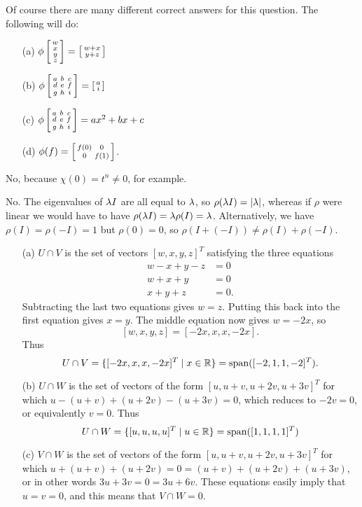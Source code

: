  Of course there are many different correct answers for this
 question.  The following will do:
 \begin{itemize}
  \item[(a)] $\phi\left[\begin{smallmatrix} w\\ x\\ y\\ z\end{smallmatrix}\right]=\left[\begin{smallmatrix} w+x\\ y+z\end{smallmatrix}\right]$
  \item[(b)] $\phi\left[\begin{smallmatrix} a&b&c \\ d&e&f\\ g&h&i\end{smallmatrix}\right] = \left[\begin{smallmatrix} a\\ i\end{smallmatrix}\right]$
  \item[(c)] $\phi\left[\begin{smallmatrix} a&b&c \\ d&e&f\\ g&h&i\end{smallmatrix}\right] = ax^2+bx+c$
  \item[(d)] $\phi(f)=\left[\begin{smallmatrix} f(0) & 0 \\ 0 & f(1) \end{smallmatrix}\right]$.
 \end{itemize}
\EndDeferredSolution

 No, because $\chi(0)=t^n\neq 0$, for example.
\EndDeferredSolution

 No.  The eigenvalues of $\lambda I$ are all equal to $\lambda$, so
 $\rho(\lambda I)=|\lambda|$, whereas if $\rho$ were linear we would
 have to have $\rho(\lambda I)=\lambda\rho(I)=\lambda$.  Alternatively,
 we have $\rho(I)=\rho(-I)=1$ but $\rho(0)=0$, so
 $\rho(I+(-I))\neq\rho(I)+\rho(-I)$.
\EndDeferredSolution

 \begin{itemize}
  \item[(a)] $U\cap V$ is the set of vectors $[w,x,y,z]^T$
   satisfying the three equations
   \begin{align*}
    w-x+y-z &= 0 \\
    w+x+y &= 0 \\
    x+y+z &= 0.
   \end{align*}
   Subtracting the last two equations gives $w=z$.  Putting
   this back into the first equation gives $x=y$.  The
   middle equation now gives $w=-2x$, so
   \[ [w,x,y,z] = [-2x,x,x,-2x]. \]
   Thus
   \[ U\cap V = \{ [-2x,x,x,-2x]^T \;|\; x\in{\mathbb{R}}\} =
       \operatorname{span}([-2,1,1,-2]^T).
   \]
  \item[(b)] $U\cap W$ is the set of vectors of the form
   $[u,u+v,u+2v,u+3v]^T$ for which
   $u-(u+v)+(u+2v)-(u+3v)=0$, which reduces to $-2v=0$, or
   equivalently $v=0$.  Thus
   \[ U\cap W = \{[u,u,u,u]^T\;|\; u\in{\mathbb{R}}\} =
       \operatorname{span}([1,1,1,1]^T)
   \]
  \item[(c)] $V\cap W$ is the set of vectors of the form
   $[u,u+v,u+2v,u+3v]^T$ for which
   $u+(u+v)+(u+2v)=0=(u+v)+(u+2v)+(u+3v)$, or in other words
   $3u+3v=0=3u+6v$.  These equations easily imply that
   $u=v=0$, and this means that $V\cap W=0$.
 \end{itemize}
\EndDeferredSolution

